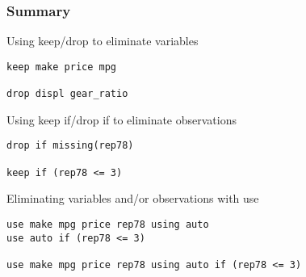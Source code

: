 \subsubsection{Summary}
\begin{compactitem}
\item Using keep/drop to eliminate variables
\begin{lstlisting}
keep make price mpg

drop displ gear_ratio
\end{lstlisting}
\item Using keep if/drop if to eliminate observations
\begin{lstlisting}
drop if missing(rep78)

keep if (rep78 <= 3)
\end{lstlisting}
\item Eliminating variables and/or observations with use
\begin{lstlisting}
use make mpg price rep78 using auto
use auto if (rep78 <= 3)

use make mpg price rep78 using auto if (rep78 <= 3)
\end{lstlisting}
\end{compactitem}
